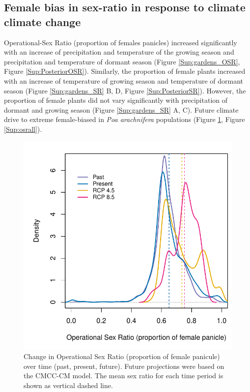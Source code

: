 \documentclass[12pt]{article}
\begin{document}
\subsection*{Female bias in sex-ratio in response to climate climate change}
Operational-Sex Ratio (proportion of females panicles) increased significantly with an increase of precipitation and temperature of the growing season and precipitation and temperature of dormant season (Figure \ref{Sup:gardens_OSR}, Figure \ref{Sup:PosteriorOSR}). 
Similarly, the proportion of female plants increased with an increase of temperature of growing season and temperature of dormant season (Figure \ref{Sup:gardens_SR} B, D, Figure \ref{Sup:PosteriorSR}).
However, the proportion of female plants did not vary significantly with precipitation of dormant and growing season (Figure \ref{Sup:gardens_SR} A, C). 
Future climate drive to extreme female-biased in \emph{Poa arachnifera} populations (Figure \ref{fig:srprojcmc}, Figure \ref{Sup:osrall}). 

\begin{figure}[H]
  \begin{center}
    \includegraphics[width=0.8\linewidth]{Figures/POAR_OSR.pdf}
  \caption{Change in Operational Sex Ratio (proportion of female panicule) over time (past, present, future).
  Future projections were based on the CMCC-CM model.
  The mean sex ratio for each time period is shown as vertical dashed line.}
  \label{fig:srprojcmc}
  \end{center}
\end{figure}
\end{document}
